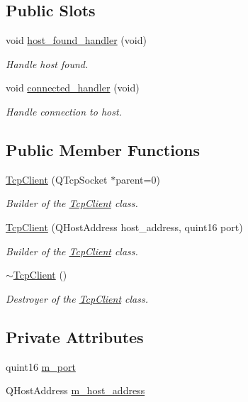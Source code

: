 \subsection*{Public Slots}
\begin{DoxyCompactItemize}
\item 
void \hyperlink{class_tcp_client_a2c1b8363f05d55bc06335f8da4c7fc8e}{host\+\_\+found\+\_\+handler} (void)
\begin{DoxyCompactList}\small\item\em Handle host found. \end{DoxyCompactList}\item 
void \hyperlink{class_tcp_client_a2467855310250aad604efaabfdccb55c}{connected\+\_\+handler} (void)
\begin{DoxyCompactList}\small\item\em Handle connection to host. \end{DoxyCompactList}\end{DoxyCompactItemize}
\subsection*{Public Member Functions}
\begin{DoxyCompactItemize}
\item 
\hyperlink{class_tcp_client_adde22f7475a79d89eca8107fd9223405}{Tcp\+Client} (Q\+Tcp\+Socket $\ast$parent=0)
\begin{DoxyCompactList}\small\item\em Builder of the \hyperlink{class_tcp_client}{Tcp\+Client} class. \end{DoxyCompactList}\item 
\hyperlink{class_tcp_client_a27a11b182cec604367594ae040e042a8}{Tcp\+Client} (Q\+Host\+Address host\+\_\+address, quint16 port)
\begin{DoxyCompactList}\small\item\em Builder of the \hyperlink{class_tcp_client}{Tcp\+Client} class. \end{DoxyCompactList}\item 
\hyperlink{class_tcp_client_a125d2277f401cbdebadb9689a5933e18}{$\sim$\+Tcp\+Client} ()
\begin{DoxyCompactList}\small\item\em Destroyer of the \hyperlink{class_tcp_client}{Tcp\+Client} class. \end{DoxyCompactList}\end{DoxyCompactItemize}
\subsection*{Private Attributes}
\begin{DoxyCompactItemize}
\item 
quint16 \hyperlink{class_tcp_client_a9c8dbdd8d4571d37bc774d17b627c2d5}{m\+\_\+port}
\item 
Q\+Host\+Address \hyperlink{class_tcp_client_acf0e0d339a1160852fd2ed2eaf4dce7f}{m\+\_\+host\+\_\+address}
\end{DoxyCompactItemize}


